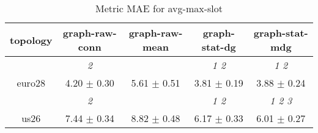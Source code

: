 \begin{table}[h]
\caption{Metric MAE for avg-max-slot}

        \centering
        \begin{tabular}{
        ccccc} \toprule 
 topology& graph-raw-conn & graph-raw-mean & graph-stat-dg & graph-stat-mdg \\ \toprule
 & \cellcolor[HTML]{EFEFEF} \textit{ 2 }& \cellcolor[HTML]{EFEFEF} & \cellcolor[HTML]{EFEFEF} \textit{ 1 2 }& \cellcolor[HTML]{EFEFEF} \textit{ 1 2 } \\ 
 {euro28}& \cellcolor[HTML]{EFEFEF} 4.20 $\pm$ 0.30& \cellcolor[HTML]{EFEFEF} 5.61 $\pm$ 0.51& \cellcolor[HTML]{EFEFEF} 3.81 $\pm$ 0.19& \cellcolor[HTML]{EFEFEF} 3.88 $\pm$ 0.24 \\ 
& \cellcolor[HTML]{EFEFEF} \textit{ 2 }& \cellcolor[HTML]{EFEFEF} & \cellcolor[HTML]{EFEFEF} \textit{ 1 2 }& \cellcolor[HTML]{EFEFEF} \textit{ 1 2 3 } \\ 
 {us26}& \cellcolor[HTML]{EFEFEF} 7.44 $\pm$ 0.34& \cellcolor[HTML]{EFEFEF} 8.82 $\pm$ 0.48& \cellcolor[HTML]{EFEFEF} 6.17 $\pm$ 0.33& \cellcolor[HTML]{EFEFEF} 6.01 $\pm$ 0.27 \\ 

        \bottomrule
        \end{tabular}%

        \end{table}
        
